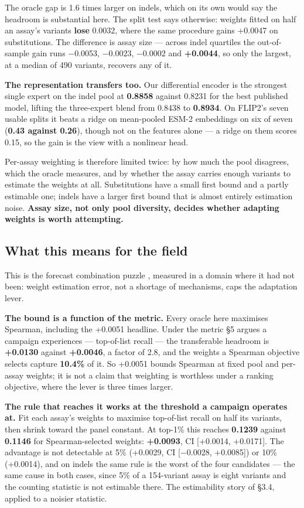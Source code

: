 \documentclass{article}
\begin{document}
The oracle gap is 1.6 times larger on indels, which on its own would say the headroom is substantial here. The
split test says otherwise: weights fitted on half an assay's variants \textbf{lose} 0.0032, where the same procedure
gains +0.0047 on substitutions. The difference is assay size --- across indel quartiles the out-of-sample gain runs
−0.0053, −0.0023, −0.0002 and \textbf{+0.0044}, so only the largest, at a median of 490 variants, recovers any of it.

\textbf{The representation transfers too.} Our differential encoder is the strongest single expert on the indel pool at
\textbf{0.8858} against 0.8231 for the best published model, lifting the three-expert blend from 0.8438 to \textbf{0.8934}. On FLIP2's seven usable splits it beats a ridge on mean-pooled ESM-2 embeddings on six of seven (\textbf{0.43 against
0.26}), though not on the features alone --- a ridge on them scores 0.15, so the gain is the view with a nonlinear
head.

Per-assay weighting is therefore limited twice: by how much the pool disagrees, which the oracle measures,
and by whether the assay carries enough variants to estimate the weights at all. Substitutions have a
small first bound and a partly estimable one; indels have a larger first bound that is almost entirely
estimation noise. \textbf{Assay size, not only pool diversity, decides whether adapting weights is worth attempting.}

\subsection{What this means for the field}\label{what-this-means-for-the-field}

This is the forecast combination puzzle \cite{claeskens2016forecast}, measured in a domain where it had not been:
weight estimation error, not a shortage of mechanisms, caps the adaptation lever.

\textbf{The bound is a function of the metric.} Every oracle here maximises Spearman, including the +0.0051 headline.
Under the metric §5 argues a campaign experiences --- top-of-list recall --- the transferable headroom is \textbf{+0.0130}
against \textbf{+0.0046}, a factor of 2.8, and the weights a Spearman objective selects capture \textbf{10.4\%} of it. So
+0.0051 bounds Spearman at fixed pool and per-assay weights; it is not a claim that weighting is worthless under a
ranking objective, where the lever is three times larger.

\textbf{The rule that reaches it works at the threshold a campaign operates at.} Fit each assay's weights to maximise
top-of-list recall on half its variants, then shrink toward the panel constant. At top-1\% this reaches \textbf{0.1239}
against \textbf{0.1146} for Spearman-selected weights: \textbf{+0.0093}, CI {[}+0.0014, +0.0171{]}. The advantage is not
detectable at 5\% (+0.0029, CI {[}−0.0028, +0.0085{]}) or 10\% (+0.0014), and on indels the same rule is the worst of the
four candidates --- the same cause in both cases, since 5\% of a 154-variant assay is eight variants and the counting
statistic is not estimable there. The estimability story of §3.4, applied to a noisier statistic.
\end{document}
